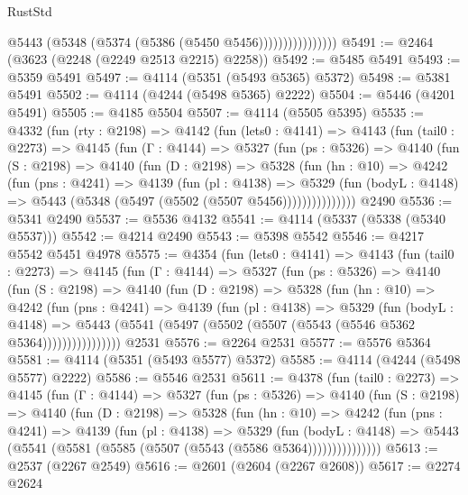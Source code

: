\begin{lexlean}{RustStd}
\begin{coremodule}
                          @5443 (@5348 (@5374 (@5386 (@5450 @5456))))))))))))))))
@5491 := @2464 (@3623 (@2248 (@2249 @2513 @2215) @2258))
@5492 := @5485 @5491
@5493 := @5359 @5491
@5497 := @4114 (@5351 (@5493 @5365) @5372)
@5498 := @5381 @5491
@5502 := @4114 (@4244 (@5498 @5365) @2222)
@5504 := @5446 (@4201 @5491)
@5505 := @4185 @5504
@5507 := @4114 (@5505 @5395)
@5535 := @4332
    (fun (rty : @2198) =>
    @4142
      (fun (lets0 : @4141) =>
      @4143
        (fun (tail0 : @2273) =>
        @4145
          (fun (Γ : @4144) =>
          @5327
            (fun (ps : @5326) =>
            @4140
              (fun (S : @2198) =>
              @4140
                (fun (D : @2198) =>
                @5328
                  (fun (hn : @10) =>
                  @4242
                    (fun (pns : @4241) =>
                    @4139
                      (fun (pl : @4138) =>
                      @5329
                        (fun (bodyL : @4148) =>
                        @5443 (@5348 (@5497 (@5502 (@5507 @5456)))))))))))))))
    @2490
@5536 := @5341 @2490
@5537 := @5536 @4132
@5541 := @4114 (@5337 (@5338 (@5340 @5537)))
@5542 := @4214 @2490
@5543 := @5398 @5542
@5546 := @4217 @5542 @5451 @4978
@5575 := @4354
    (fun (lets0 : @4141) =>
    @4143
      (fun (tail0 : @2273) =>
      @4145
        (fun (Γ : @4144) =>
        @5327
          (fun (ps : @5326) =>
          @4140
            (fun (S : @2198) =>
            @4140
              (fun (D : @2198) =>
              @5328
                (fun (hn : @10) =>
                @4242
                  (fun (pns : @4241) =>
                  @4139
                    (fun (pl : @4138) =>
                    @5329
                      (fun (bodyL : @4148) =>
                      @5443 (@5541 (@5497 (@5502 (@5507 (@5543 (@5546 @5362 @5364))))))))))))))))
    @2531
@5576 := @2264 @2531
@5577 := @5576 @5364
@5581 := @4114 (@5351 (@5493 @5577) @5372)
@5585 := @4114 (@4244 (@5498 @5577) @2222)
@5586 := @5546 @2531
@5611 := @4378
    (fun (tail0 : @2273) =>
    @4145
      (fun (Γ : @4144) =>
      @5327
        (fun (ps : @5326) =>
        @4140
          (fun (S : @2198) =>
          @4140
            (fun (D : @2198) =>
            @5328
              (fun (hn : @10) =>
              @4242
                (fun (pns : @4241) =>
                @4139
                  (fun (pl : @4138) =>
                  @5329
                    (fun (bodyL : @4148) =>
                    @5443 (@5541 (@5581 (@5585 (@5507 (@5543 (@5586 @5364)))))))))))))))
@5613 := @2537 (@2267 @2549)
@5616 := @2601 (@2604 (@2267 @2608))
@5617 := @2274 @2624

\end{coremodule}
\end{lexlean}
